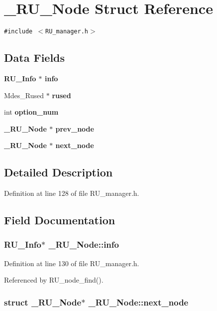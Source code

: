 \section{\_\-RU\_\-Node Struct Reference}
\label{struct__RU__Node}
{\tt \#include $<$RU\_\-manager.h$>$}

\subsection*{Data Fields}
\begin{CompactItemize}
\item 
\bf{RU\_\-Info} $\ast$ \bf{info}
\item 
Mdes\_\-Rused $\ast$ \bf{rused}
\item 
int \bf{option\_\-num}
\item 
\bf{\_\-RU\_\-Node} $\ast$ \bf{prev\_\-node}
\item 
\bf{\_\-RU\_\-Node} $\ast$ \bf{next\_\-node}
\end{CompactItemize}


\subsection{Detailed Description}




Definition at line 128 of file RU\_\-manager.h.

\subsection{Field Documentation}
\subsubsection{\setlength{\rightskip}{0pt plus 5cm}\bf{RU\_\-Info}$\ast$ \bf{\_\-RU\_\-Node::info}}\label{struct__RU__Node_f422ed39c1dd54b72ba1b5f37446e489}




Definition at line 130 of file RU\_\-manager.h.

Referenced by RU\_\-node\_\-find().
\subsubsection{\setlength{\rightskip}{0pt plus 5cm}struct \bf{\_\-RU\_\-Node}$\ast$ \bf{\_\-RU\_\-Node::next\_\-node}}\label{struct__RU__Node_1e24a03a249fcd0fb58887417d22f889}




